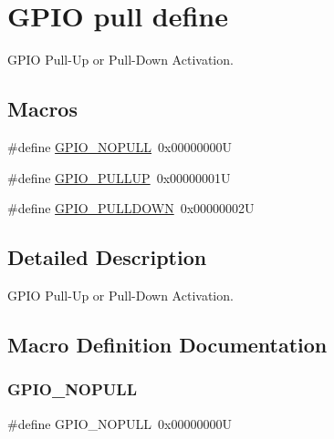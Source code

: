 \hypertarget{group___g_p_i_o__pull__define}{}\section{G\+P\+IO pull define}
\label{group___g_p_i_o__pull__define}


G\+P\+IO Pull-\/\+Up or Pull-\/\+Down Activation.  


\subsection*{Macros}
\begin{DoxyCompactItemize}
\item 
\#define \hyperlink{group___g_p_i_o__pull__define_ga5c2862579882c1cc64e36d38fbd07a4c}{G\+P\+I\+O\+\_\+\+N\+O\+P\+U\+LL}~0x00000000U
\item 
\#define \hyperlink{group___g_p_i_o__pull__define_gae689bc8f5c42d6df7bd54a8dd372e072}{G\+P\+I\+O\+\_\+\+P\+U\+L\+L\+UP}~0x00000001U
\item 
\#define \hyperlink{group___g_p_i_o__pull__define_ga75d958d0410c36da7f27d1f4f5c36c14}{G\+P\+I\+O\+\_\+\+P\+U\+L\+L\+D\+O\+WN}~0x00000002U
\end{DoxyCompactItemize}


\subsection{Detailed Description}
G\+P\+IO Pull-\/\+Up or Pull-\/\+Down Activation. 



\subsection{Macro Definition Documentation}
\mbox{\label{group___g_p_i_o__pull__define_ga5c2862579882c1cc64e36d38fbd07a4c}} 
\subsubsection{\texorpdfstring{G\+P\+I\+O\+\_\+\+N\+O\+P\+U\+LL}{GPIO\_NOPULL}}
{\footnotesize\ttfamily \#define G\+P\+I\+O\+\_\+\+N\+O\+P\+U\+LL~0x00000000U}

